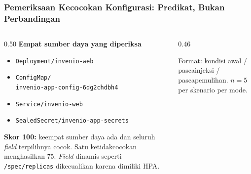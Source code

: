 {
\usebackgroundtemplate{\backgroundcontent}
\begin{frame}
    \frametitle{Pemeriksaan Kecocokan Konfigurasi: Predikat, Bukan Perbandingan}
    \begin{columns}[T]
        \begin{column}{0.50\textwidth}
            \scriptsize
            \textbf{Empat sumber daya yang diperiksa}
            \begin{itemize}\setlength{\itemsep}{1pt}
                \item \texttt{Deployment/invenio-web}
                \item \texttt{ConfigMap/}\\
                      \texttt{invenio-app-config-6dg2chdbh4}
                \item \texttt{Service/invenio-web}
                \item \texttt{SealedSecret/invenio-app-secrets}
            \end{itemize}
            \vspace{0.06cm}
            \textbf{Skor 100:} keempat sumber daya ada dan seluruh \textit{field} terpilihnya cocok.
            Satu ketidakcocokan menghasilkan 75. \textit{Field} dinamis seperti \texttt{/spec/replicas} dikecualikan karena dimiliki HPA.
        \end{column}
        \begin{column}{0.46\textwidth}
            \centering
            \scriptsize
            \par\vspace{0.08cm}
            \raggedleft Format: kondisi awal / pascainjeksi / pascapemulihan. $n=5$ per skenario per mode.
        \end{column}
    \end{columns}
    \vspace{0.04cm}
\end{frame}
}

